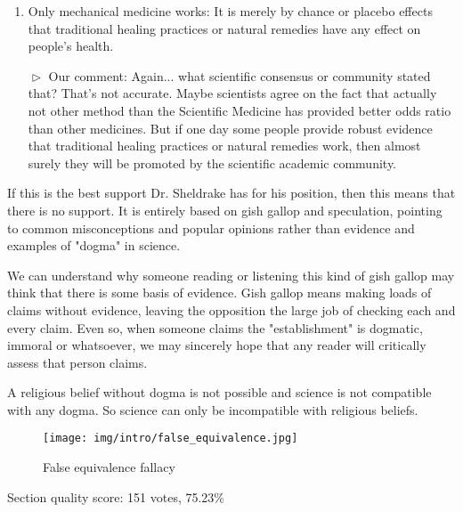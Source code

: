 \begin{enumerate}
		\item \og Only mechanical medicine works: It is merely by chance or placebo effects that traditional healing practices or natural remedies have any effect on people's health. \fg{}
		
		$\vartriangleright$ Our comment: Again... what scientific consensus or community stated that? That's not accurate. Maybe scientists agree on the fact that actually not other method than the Scientific Medicine has provided better odds ratio than other medicines. But if one day some people provide robust evidence that traditional healing practices or natural remedies work, then almost surely they will be promoted by the scientific academic community.
	\end{enumerate}
	
	If this is the best support Dr. Sheldrake has for his position, then this means that there is no support. It is entirely based on gish gallop and speculation, pointing to common misconceptions and popular opinions rather than evidence and examples of "dogma" in science.
	
	We can understand why someone reading or listening this kind of gish gallop may think that there is some basis of evidence. Gish gallop means making loads of claims without evidence, leaving the opposition the large job of checking each and every claim. Even so, when someone claims the "establishment" is dogmatic, immoral or whatsoever, we may sincerely hope that any reader will critically assess that person claims.
	
	\begin{fquote}[?]A religious belief without dogma is not possible and science is not compatible with any dogma. So science can only be incompatible with religious beliefs.
 	\end{fquote}
	
	\begin{figure}[H]
		\centering
		\texttt{[image: img/intro/false\_equivalence.jpg]}
		\caption{False equivalence fallacy}
	\end{figure}
	
	\begin{flushright}
	Section quality score:  151 votes, 75.23\%
	\end{flushright}